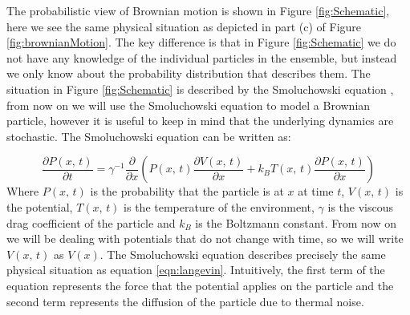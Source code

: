 The probabilistic view of Brownian motion is shown in Figure \ref{fig:Schematic}, here we see the same physical situation as depicted in part (c) of Figure \ref{fig:brownianMotion}. The key difference is that in Figure \ref{fig:Schematic} we do not have any knowledge of the individual particles in the ensemble, but instead we only know about the probability distribution that describes them. The situation in Figure \ref{fig:Schematic} is described by the Smoluchowski equation \cite{Gardiner2009}, from now on we will use the Smoluchowski equation to model a Brownian particle, however it is useful to keep in mind that the underlying dynamics are stochastic. The Smoluchowski equation can be written as:

\begin{equation}
\frac{\partial P(x, \, t)}{\partial t} =  \gamma^{-1} \frac{\partial}{\partial x} \left (P(x, \, t) \frac{\partial V(x, \, t)}{\partial x} + k_B T(x,  \, t) \frac{\partial P(x, \, t)}{\partial x} \right )
\end{equation}
Where $P(x, \, t)$ is the probability that the particle is at $x$ at time $t$, $V(x, \, t )$ is the potential, $T(x, \, t)$ is the temperature of the environment, $\gamma$ is the viscous drag coefficient of the particle and $k_B$ is the Boltzmann constant. From now on we will be dealing with potentials that do not change with time, so we will write $V(x, \, t)$ as $V(x)$. The Smoluchowski equation describes precisely the same physical situation as equation \ref{eqn:langevin}. Intuitively, the first term of the equation represents the force that the potential applies on the particle and the second term represents the diffusion of the particle due to thermal noise.

